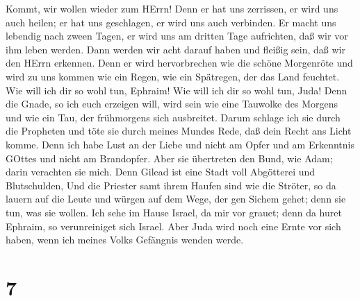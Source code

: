  Kommt, wir wollen wieder zum HErrn! Denn er hat uns
zerrissen, er wird uns auch heilen; er hat uns geschlagen, er wird uns
auch verbinden.  Er macht uns lebendig nach zween Tagen, er
wird uns am dritten Tage aufrichten, daß wir vor ihm leben werden.
 Dann werden wir acht darauf haben und fleißig sein, daß wir
den HErrn erkennen. Denn er wird hervorbrechen wie die schöne Morgenröte
und wird zu uns kommen wie ein Regen, wie ein Spätregen, der das Land
feuchtet.  Wie will ich dir so wohl tun, Ephraim! Wie will
ich dir so wohl tun, Juda! Denn die Gnade, so ich euch erzeigen will,
wird sein wie eine Tauwolke des Morgens und wie ein Tau, der frühmorgens
sich ausbreitet.  Darum schlage ich sie durch die Propheten
und töte sie durch meines Mundes Rede, daß dein Recht ans Licht komme.
 Denn ich habe Lust an der Liebe und nicht am Opfer und am
Erkenntnis GOttes und nicht am Brandopfer.  Aber sie
übertreten den Bund, wie Adam; darin verachten sie mich. 
Denn Gilead ist eine Stadt voll Abgötterei und Blutschulden,
 Und die Priester samt ihrem Haufen sind wie die Ströter, so
da lauern auf die Leute und würgen auf dem Wege, der gen Sichem gehet;
denn sie tun, was sie wollen.  Ich sehe im Hause Israel, da
mir vor grauet; denn da huret Ephraim, so verunreiniget sich Israel.
 Aber Juda wird noch eine Ernte vor sich haben, wenn ich
meines Volks Gefängnis wenden werde.

\hypertarget{section-6}{%
\section{7}\label{section-6}}

